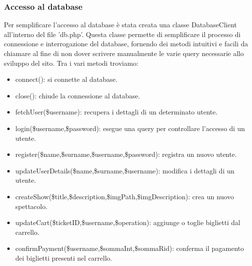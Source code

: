 \subsubsection{Accesso al database}
Per semplificare l'accesso al database è stata creata una classe DatabaseClient all'interno del file 'db.php'. Questa classe permette di semplificare il processo di connessione e interrogazione del database, fornendo dei metodi intuitivi e facili da chiamare al fine di non dover scrivere manualmente le varie query necessarie allo sviluppo del sito.
Tra i vari metodi troviamo:
\begin{itemize}
    \item connect(): si connette al database.
    \item close(): chiude la connessione al database.
    \item fetchUser(\$username): recupera i dettagli di un determinato utente.
    \item login(\$username,\$password): esegue una query per controllare l'accesso di un utente.
    \item register(\$name,\$surname,\$username,\$password): registra un nuovo utente.
    \item updateUserDetails(\$name,\$surname,\$username): modifica i dettagli di un utente.
    \item createShow(\$title,\$description,\$imgPath,\$imgDescription): crea un nuovo spettacolo.
    \item updateCart(\$ticketID,\$username,\$operation): aggiunge o toglie biglietti dal carrello.
    \item confirmPayment(\$username,\$sommaInt,\$sommaRid): conferma il pagamento dei biglietti presenti nel carrello.
\end{itemize}
